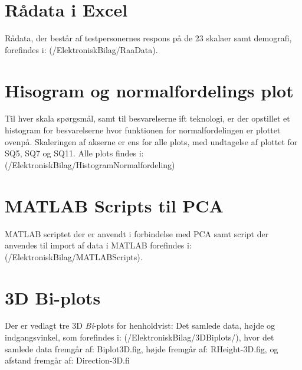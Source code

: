 \section{Rådata i Excel}
\label{ElektroniskBilagExcel}
%
Rådata, der består af testpersonernes respons på de 23 skalaer samt demografi, forefindes i: (/ElektroniskBilag/RaaData).

\section{Hisogram og normalfordelings plot}
\label{ElektroniskBilagHistNormal}
%
Til hver skala spørgsmål, samt til besvarelserne ift teknologi, er der opstillet et histogram for besvarelserne hvor funktionen for normalfordelingen er plottet ovenpå.  
Skaleringen af akserne er ens for alle plots, med undtagelse af plottet for SQ5, SQ7 og SQ11. Alle plots findes i: (/ElektroniskBilag/HistogramNormalfordeling)

\section{MATLAB Scripts til PCA}
\label{ElektroniskBilagMatLabPCA}
%
MATLAB scriptet der er anvendt i forbindelse med PCA samt script der anvendes til import af data i MATLAB forefindes i: (/ElektroniskBilag/MATLABScripts).

\section{3D Bi-plots}
\label{ElektroniskBilag3D}
%
Der er vedlagt tre 3D \textit{Bi}-plots for henholdvist: Det samlede data, højde og indgangsvinkel, som forefindes i: (/ElektroniskBilag/3DBiplots/), hvor det samlede data fremgår af: Biplot3D.fig, højde fremgår af: RHeight-3D.fig, og afstand fremgår af: Direction-3D.fi

